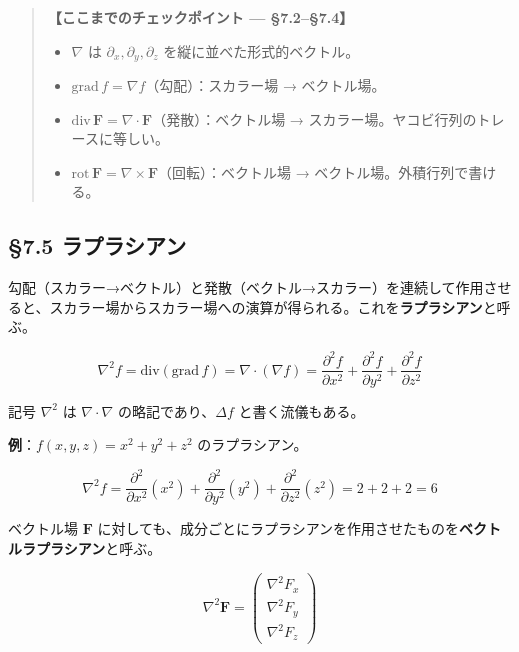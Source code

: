\documentclass[a4paper,12pt,openany]{book}
\begin{document}
\begin{quote}
\textbf{【ここまでのチェックポイント — §7.2–§7.4】}

\begin{itemize}
\item
  \(\nabla\) は \(\partial_x,\partial_y,\partial_z\)
  を縦に並べた形式的ベクトル。
\item
  \(\mathrm{grad}\,f = \nabla f\)（勾配）：スカラー場 → ベクトル場。
\item
  \(\mathrm{div}\,\mathbf{F} = \nabla \cdot \mathbf{F}\)（発散）：ベクトル場
  → スカラー場。ヤコビ行列のトレースに等しい。
\item
  \(\mathrm{rot}\,\mathbf{F} = \nabla \times \mathbf{F}\)（回転）：ベクトル場
  → ベクトル場。外積行列で書ける。
\end{itemize}
\end{quote}

\par\vspace{0.35em}\par

\hypertarget{ux30e9ux30d7ux30e9ux30b7ux30a2ux30f3}{%
\subsection{§7.5
ラプラシアン}\label{ux30e9ux30d7ux30e9ux30b7ux30a2ux30f3}}

勾配（スカラー→ベクトル）と発散（ベクトル→スカラー）を連続して作用させると、スカラー場からスカラー場への演算が得られる。これを\textbf{ラプラシアン}と呼ぶ。

\[\nabla^2 f = \mathrm{div}(\mathrm{grad}\,f) = \nabla \cdot (\nabla f) = \frac{\partial^2 f}{\partial x^2} + \frac{\partial^2 f}{\partial y^2} + \frac{\partial^2 f}{\partial z^2}\]

記号 \(\nabla^2\) は \(\nabla \cdot \nabla\) の略記であり、\(\Delta f\)
と書く流儀もある。

\textbf{例}：\(f(x,y,z) = x^2 + y^2 + z^2\) のラプラシアン。

\[\nabla^2 f = \frac{\partial^2}{\partial x^2}(x^2) + \frac{\partial^2}{\partial y^2}(y^2) + \frac{\partial^2}{\partial z^2}(z^2) = 2 + 2 + 2 = 6\]

ベクトル場 \(\mathbf{F}\)
に対しても、成分ごとにラプラシアンを作用させたものを\textbf{ベクトルラプラシアン}と呼ぶ。

\[\nabla^2 \mathbf{F} = \begin{pmatrix} \nabla^2 F_x \\ \nabla^2 F_y \\ \nabla^2 F_z \end{pmatrix}\]
\end{document}
